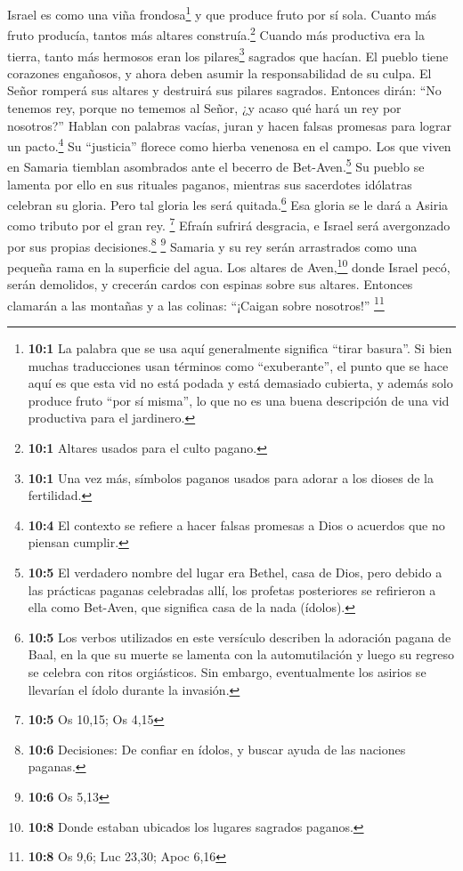  Israel es como una viña frondosa\footnote{\textbf{10:1}
  La palabra que se usa aquí generalmente significa ``tirar basura''. Si
  bien muchas traducciones usan términos como ``exuberante'', el punto
  que se hace aquí es que esta vid no está podada y está demasiado
  cubierta, y además solo produce fruto ``por sí misma'', lo que no es
  una buena descripción de una vid productiva para el jardinero.} y que
produce fruto por sí sola. Cuanto más fruto producía, tantos más altares
construía.\footnote{\textbf{10:1} Altares usados para el culto pagano.}
Cuando más productiva era la tierra, tanto más hermosos eran los
pilares\footnote{\textbf{10:1} Una vez más, símbolos paganos usados para
  adorar a los dioses de la fertilidad.} sagrados que hacían.
 El pueblo tiene corazones engañosos, y ahora deben asumir
la responsabilidad de su culpa. El Señor romperá sus altares y destruirá
sus pilares sagrados.  Entonces dirán: ``No tenemos rey,
porque no tememos al Señor, ¿y acaso qué hará un rey por nosotros?''
 Hablan con palabras vacías, juran y hacen falsas promesas
para lograr un pacto.\footnote{\textbf{10:4} El contexto se refiere a
  hacer falsas promesas a Dios o acuerdos que no piensan cumplir.} Su
``justicia'' florece como hierba venenosa en el campo. 
Los que viven en Samaria tiemblan asombrados ante el becerro de
Bet-Aven.\footnote{\textbf{10:5} El verdadero nombre del lugar era
  Bethel, casa de Dios, pero debido a las prácticas paganas celebradas
  allí, los profetas posteriores se refirieron a ella como Bet-Aven, que
  significa casa de la nada (ídolos).} Su pueblo se lamenta por ello en
sus rituales paganos, mientras sus sacerdotes idólatras celebran su
gloria. Pero tal gloria les será quitada.\footnote{\textbf{10:5} Los
  verbos utilizados en este versículo describen la adoración pagana de
  Baal, en la que su muerte se lamenta con la automutilación y luego su
  regreso se celebra con ritos orgiásticos. Sin embargo, eventualmente
  los asirios se llevarían el ídolo durante la invasión.} Esa gloria se
le dará a Asiria como tributo por el gran rey. \footnote{\textbf{10:5}
  Os 10,15; Os 4,15}  Efraín sufrirá desgracia, e Israel
será avergonzado por sus propias decisiones.\footnote{\textbf{10:6}
  Decisiones: De confiar en ídolos, y buscar ayuda de las naciones
  paganas.} \footnote{\textbf{10:6} Os 5,13}  Samaria y su
rey serán arrastrados como una pequeña rama en la superficie del agua.
 Los altares de Aven,\footnote{\textbf{10:8} Donde estaban
  ubicados los lugares sagrados paganos.} donde Israel pecó, serán
demolidos, y crecerán cardos con espinas sobre sus altares. Entonces
clamarán a las montañas y a las colinas: ``¡Caigan sobre nosotros!''
\footnote{\textbf{10:8} Os 9,6; Luc 23,30; Apoc 6,16}

